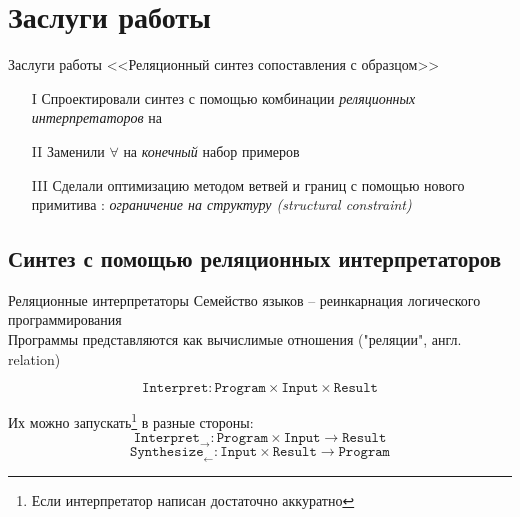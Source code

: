 \documentclass[aspectratio=169
  , xcolor={svgnames}
  , hyperref={ colorlinks,citecolor=Blue
             , linkcolor=DarkRed,urlcolor=DarkBlue}
  , russian
  ]{beamer}
\newcommand{\contributions}{
\begin{enumerate}
\item[I] Спроектировали синтез с помощью комбинации \emph{реляционных интерпретаторов} на \miniKanren{}
\item[II] Заменили $\forall$ на \emph{конечный} набор примеров
\item[III] Сделали оптимизацию методом ветвей и границ с помощью нового примитива \miniKanren{}: \emph{ограничение на структуру (structural constraint)}
\end{enumerate}
}
\begin{document}
\section{Заслуги работы}

\begin{frame}{Заслуги работы <<Реляционный синтез сопоставления с образцом>>}
\Large
\contributions
\end{frame}

\subsection{Синтез с помощью реляционных интерпретаторов}

\begin{frame}{Реляционные интерпретаторы}
Семейство языков \miniKanren{} -- реинкарнация логического программирования\\

Программы представляются как вычислимые отношения ("реляции", англ. relation)

\[
  \texttt{Interpret}: \texttt{Program} \times \texttt{Input} \times \texttt{Result}
\]

Их можно запускать\footnote{Если интерпретатор написан достаточно аккуратно} в разные стороны:
\[
  \texttt{Interpret}_{\rightarrow}: \texttt{Program} \times \texttt{Input} \rightarrow \texttt{Result}
\]
\[
  \texttt{Synthesize}_{\leftarrow}:   \texttt{Input} \times \texttt{Result} \rightarrow \texttt{Program}
\]
\end{frame}
\end{document}
